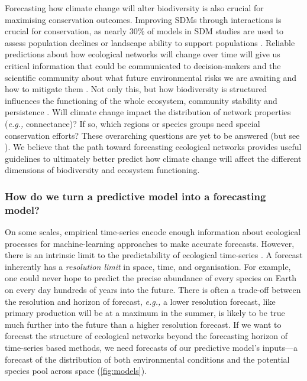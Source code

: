 Forecasting how climate change will alter biodiversity is also crucial
for maximising conservation outcomes. Improving SDMs through
interactions is crucial for conservation, as nearly 30\% of models in
SDM studies are used to assess population declines or landscape ability
to support populations \cite{Araujo2019StaDis}. Reliable predictions
about how ecological networks will change over time will give us
critical information that could be communicated to decision-makers and
the scientific community about what future environmental risks we are
awaiting and how to mitigate them \cite{Kindsvater2018OveDat}. Not only
this, but how biodiversity is structured influences the functioning of
the whole ecosystem, community stability and persistence
\cite{Thompson2012FooWeb, Stouffer2010UndFoo}. Will climate change
impact the distribution of network properties (\emph{e.g.,} connectance)? If so,
which regions or species groups need special conservation efforts? These
overarching questions are yet to be answered (but see
\cite{Albouy2013ProCli, Kortsch2015CliCha, Hattab2016ForFin}). We believe
that the path toward forecasting ecological networks provides useful
guidelines to ultimately better predict how climate change will affect
the different dimensions of biodiversity and ecosystem functioning.

\subsubsection{How do we turn a predictive model into a forecasting
model?}\label{how-do-we-turn-a-predictive-model-into-a-forecasting-model}

On some scales, empirical time-series encode enough information about
ecological processes for machine-learning approaches to make accurate
forecasts. However, there is an intrinsic limit to the predictability of
ecological time-series \cite{Pennekamp2019IntPre}. A forecast inherently
has a \emph{resolution limit} in space, time, and organisation. For
example, one could never hope to predict the precise abundance of every
species on Earth on every day hundreds of years into the future. There
is often a trade-off between the resolution and horizon of forecast,
\emph{e.g.,} a lower resolution forecast, like primary production will be at a
maximum in the summer, is likely to be true much further into the future
than a higher resolution forecast. If we want to forecast the structure
of ecological networks beyond the forecasting horizon of time-series
based methods, we need forecasts of our predictive model's inputs---a
forecast of the distribution of both environmental conditions and the
potential species pool across space (\autoref{fig:models}).

